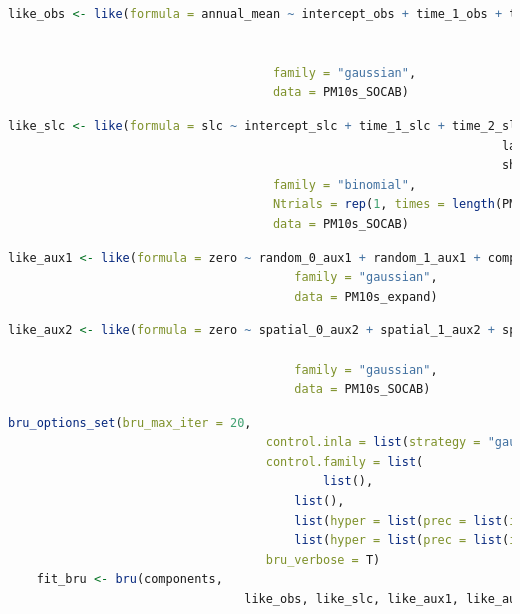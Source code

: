 \begin{lstlisting}[language = R]
	like_obs <- like(formula = annual_mean ~ intercept_obs + time_1_obs + time_2_obs +     
																					 random_0_obs + random_1_obs + 
																					 spatial_0_obs + spatial_1_obs + spatial_2_obs,  
									 family = "gaussian",  
									 data = PM10s_SOCAB)
\end{lstlisting} \label{code:inlabru_lik_obs}

\begin{lstlisting}[language = R]
	like_slc <- like(formula = slc ~ intercept_slc + time_1_slc + time_2_slc +     
																	 lag_slc + repuls_slc + ar_slc + spatial_slc +     
																	 share_aux1 + share_aux2,  
									 family = "binomial",  
									 Ntrials = rep(1, times = length(PM10s_SOCAB$slc)),  
									 data = PM10s_SOCAB)
\end{lstlisting} \label{code:inlabru_lik_slc}

\begin{lstlisting}[language = R]
	like_aux1 <- like(formula = zero ~ random_0_aux1 + random_1_aux1 + comp_aux1,  
										family = "gaussian",  
										data = PM10s_expand)
\end{lstlisting} \label{code:inlabru_lik_aux1}

\begin{lstlisting}[language = R]
	like_aux2 <- like(formula = zero ~ spatial_0_aux2 + spatial_1_aux2 + spatial_2_aux2 + 
																		 comp_aux2,  
										family = "gaussian",  
										data = PM10s_SOCAB)
\end{lstlisting} \label{code:inlabru_lik_aux2}

\begin{lstlisting}[language = R]
	bru_options_set(bru_max_iter = 20,                
									control.inla = list(strategy = "gaussian", int.strategy = 'eb'),                
									control.family = list(
											list(), 
								    	list(), 
								     	list(hyper = list(prec = list(initial = 20, fixed=TRUE))),                  
								     	list(hyper = list(prec = list(initial = 20, fixed=TRUE)))),                
									bru_verbose = T)
	fit_bru <- bru(components, 
								 like_obs, like_slc, like_aux1, like_aux2)
\end{lstlisting} \label{code:inlabru_fit}